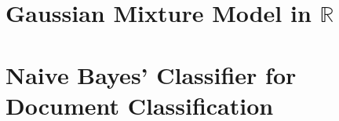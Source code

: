 \documentclass[11pt, a4 paper]{article}
\newcommand{\rr}{\mathbb{R}}
\begin{document}
\section{Gaussian Mixture Model in $\rr$}
\label{sec:gmm}

\label{prob:3}



\section{Naive Bayes' Classifier for Document Classification}
\label{sec:docClassification}


\end{document}
